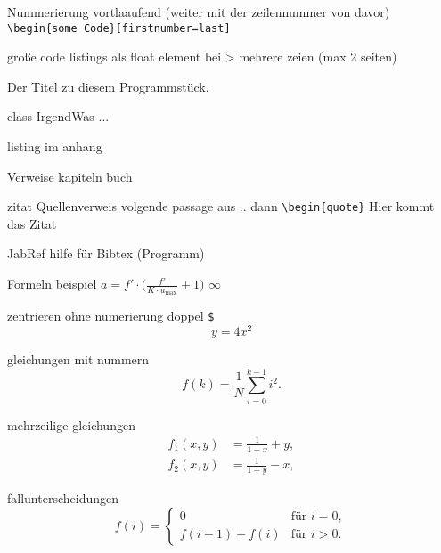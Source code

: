 

Nummerierung vortlaaufend (weiter mit der zeilennummer von davor)
\verb|\begin{some Code}[firstnumber=last]|

große code listings
als float element bei > mehrere zeien  (max 2 seiten)
\begin{program}
\caption{Der Titel zu diesem Programmstück.}
\label{prog:xyz}
\begin{JavaCode}
class IrgendWas {
...
}
\end{JavaCode}
\end{program}


listing im anhang
\begin{footnotesize}

\end{footnotesize}


Verweise kapiteln buch
\cite[Kap.\ 5]{Kopka98}

zitat Quellenverweis
volgende passage aus .. \cite{Kopka98}
dann \verb|\begin{quote}| Hier kommt das Zitat



JabRef hilfe für Bibtex    (Programm)






Formeln beispiel
$\bar{a} = f' \cdot \bigl( \frac{f'}{K \cdot u_{\max}} + 1 \bigr)$
$\infty$



zentrieren ohne numerierung  doppel \verb|$|
$$ y = 4 x^2 $$


gleichungen mit nummern
\begin{equation}
f(k) = \frac{1}{N} \sum_{i=0}^{k-1} i^2 . 
\label{eq:MyFirstEquation}
\end{equation}


mehrzeilige gleichungen 
\begin{align}
f_1 (x,y) &= \frac{1}{1-x} + y , \label{eq:f1} \\
f_2 (x,y) &= \frac{1}{1+y} - x , \label{eq:f2}
\end{align}



fallunterscheidungen 
\begin{equation}
f(i) =
\begin{cases}
0             & \text{für $i = 0$},\\
f(i-1) + f(i) & \text{für $i > 0$}.
\end{cases}
\end{equation}



